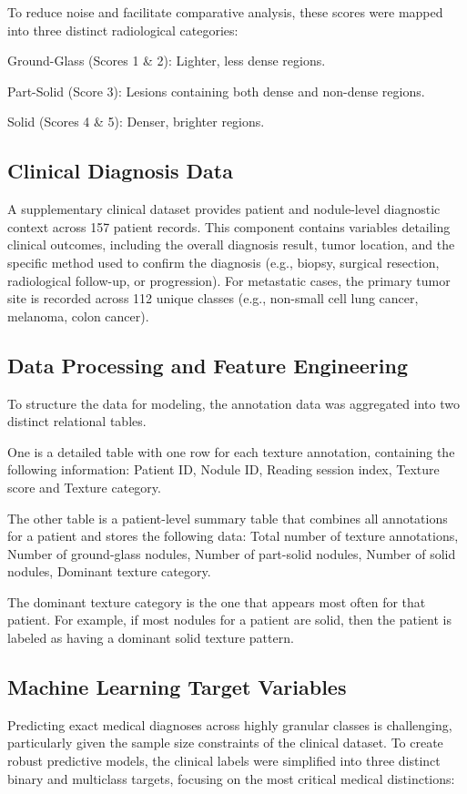 To reduce noise and facilitate comparative analysis, these scores were mapped into three distinct radiological categories:

Ground-Glass (Scores 1 \& 2): Lighter, less dense regions.

Part-Solid (Score 3): Lesions containing both dense and non-dense regions.

Solid (Scores 4 \& 5): Denser, brighter regions.

\subsection{Clinical Diagnosis Data}
A supplementary clinical dataset provides patient and nodule-level diagnostic context across 157 patient records. This component contains variables detailing clinical outcomes, including the overall diagnosis result, tumor location, and the specific method used to confirm the diagnosis (e.g., biopsy, surgical resection, radiological follow-up, or progression). For metastatic cases, the primary tumor site is recorded across 112 unique classes (e.g., non-small cell lung cancer, melanoma, colon cancer).

\subsection{Data Processing and Feature Engineering}
To structure the data for modeling, the annotation data was aggregated into two distinct relational tables.

One is a detailed table with one row for each texture annotation, containing the following information: Patient ID, Nodule ID, Reading session index, Texture score and Texture category.

The other table is a patient-level summary table that combines all annotations for a patient and stores the following data: Total number of texture annotations, Number of ground-glass nodules, Number of part-solid nodules, Number of solid nodules, Dominant texture category.

The dominant texture category is the one that appears most often for that patient. For example, if most nodules for a patient are solid, then the patient is labeled as having a dominant solid texture pattern.

\subsection{Machine Learning Target Variables}
Predicting exact medical diagnoses across highly granular classes is challenging, particularly given the sample size constraints of the clinical dataset. To create robust predictive models, the clinical labels were simplified into three distinct binary and multiclass targets, focusing on the most critical medical distinctions:

